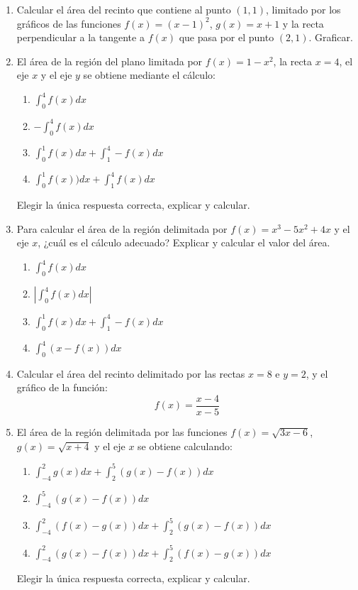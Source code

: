 \documentclass[12pt]{article}
\theoremstyle{definition}
\begin{document}
\begin{enumerate}
\item  
Calcular el área del recinto que contiene al punto $(1,1)$, limitado por los gráficos de las funciones $f(x)= (x-1)^2$, $g(x)=x+1$ y la recta perpendicular a la tangente a $f(x)$ que pasa por el punto $(2,1)$. Graficar.

\item  
El área de la región del plano limitada por $f(x)=1-x^2$, la recta $x=4$, el eje $x$ y el eje $y$ se obtiene mediante el cálculo:
\begin{enumerate}
\item  $\int_{0}^{4}f(x)dx$
\item  $-\int_{0}^{4}f(x)dx$
\item  $\int_{0}^{1}f(x)dx + \int_{1}^{4}-f(x)dx$
\item  $\int_{0}^{1}f(x))dx + \int_{1}^{4}f(x)dx$
\end{enumerate}
Elegir la única respuesta correcta, explicar y calcular. 

\item  
Para calcular el área de la región delimitada por $f(x)= x^3-5x^2+4x$ y el eje $x$, ¿cuál es el cálculo adecuado? Explicar y calcular el valor del área.
\begin{enumerate}
\item  $\int_{0}^{4}f(x)dx$
\item  $|\int_{0}^{4}f(x)dx|$
\item  $\int_{0}^{1}f(x)dx + \int_{1}^{4}-f(x)dx$
\item  $\int_{0}^{4}(x - f(x))dx$
\end{enumerate}

\item  
Calcular el área del recinto delimitado por las rectas $x=8$ e $y = 2$, y el gráfico de la función:
\begin{equation*}
f(x)=\frac{x-4}{x-5}
\end{equation*}



\item  
El área de la región delimitada por las funciones $f(x) = \sqrt{3x-6}$, $g(x) = \sqrt{x+4}$ y el eje $x$ se obtiene calculando:
\begin{enumerate}
\item  $\int_{-4}^{2}g(x) dx + \int_{2}^{5}(g(x) - f(x)) dx$
\item  $\int_{-4}^{5}(g(x) - f(x)) dx$
\item  $\int_{-4}^{2}(f(x)-g(x)) dx + \int_{2}^{5}(g(x) - f(x))dx$
\item  $\int_{-4}^{2}(g(x) - f(x))dx + \int_{2}^{5}(f(x) - g(x))dx$
\end{enumerate}
Elegir la única respuesta correcta, explicar y calcular. 


\end{enumerate}
\end{document}
